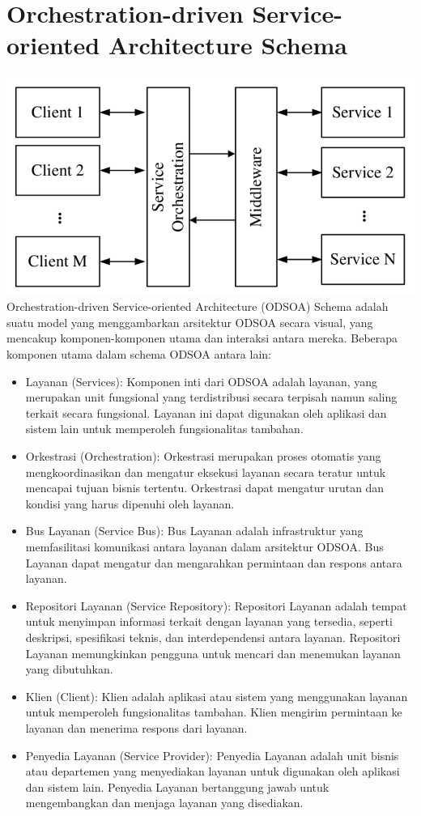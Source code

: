\section{Orchestration-driven Service-oriented Architecture Schema}
\includegraphics[scale=0.4]{../images/ODSOA.png}
Orchestration-driven Service-oriented Architecture (ODSOA) Schema adalah suatu model yang menggambarkan arsitektur ODSOA secara visual, yang mencakup komponen-komponen utama dan interaksi antara mereka. Beberapa komponen utama dalam schema ODSOA antara lain:
	\begin{itemize}
	\item Layanan (Services): Komponen inti dari ODSOA adalah layanan, yang merupakan unit fungsional yang terdistribusi secara terpisah namun saling terkait secara fungsional. Layanan ini dapat digunakan oleh aplikasi dan sistem lain untuk memperoleh fungsionalitas tambahan.
	\item Orkestrasi (Orchestration): Orkestrasi merupakan proses otomatis yang mengkoordinasikan dan mengatur eksekusi layanan secara teratur untuk mencapai tujuan bisnis tertentu. Orkestrasi dapat mengatur urutan dan kondisi yang harus dipenuhi oleh layanan.
	\item Bus Layanan (Service Bus): Bus Layanan adalah infrastruktur yang memfasilitasi komunikasi antara layanan dalam arsitektur ODSOA. Bus Layanan dapat mengatur dan mengarahkan permintaan dan respons antara layanan.
	\item Repositori Layanan (Service Repository): Repositori Layanan adalah tempat untuk menyimpan informasi terkait dengan layanan yang tersedia, seperti deskripsi, spesifikasi teknis, dan interdependensi antara layanan. Repositori Layanan memungkinkan pengguna untuk mencari dan menemukan layanan yang dibutuhkan.
	\item Klien (Client): Klien adalah aplikasi atau sistem yang menggunakan layanan untuk memperoleh fungsionalitas tambahan. Klien mengirim permintaan ke layanan dan menerima respons dari layanan.
	\item Penyedia Layanan (Service Provider): Penyedia Layanan adalah unit bisnis atau departemen yang menyediakan layanan untuk digunakan oleh aplikasi dan sistem lain. Penyedia Layanan bertanggung jawab untuk mengembangkan dan menjaga layanan yang disediakan.
	\end{itemize}
